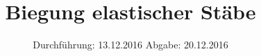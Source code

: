 


\subject{V103}
\title{Biegung elastischer Stäbe}
\date{
	Durchführung: 13.12.2016
	\hspace{4em}
	Abgabe: 20.12.2016
}


	\maketitle
	\newpage
	\tableofcontents
	\newpage
	
	
	
	
	
	
	\newpage
	
	\printbibliography

